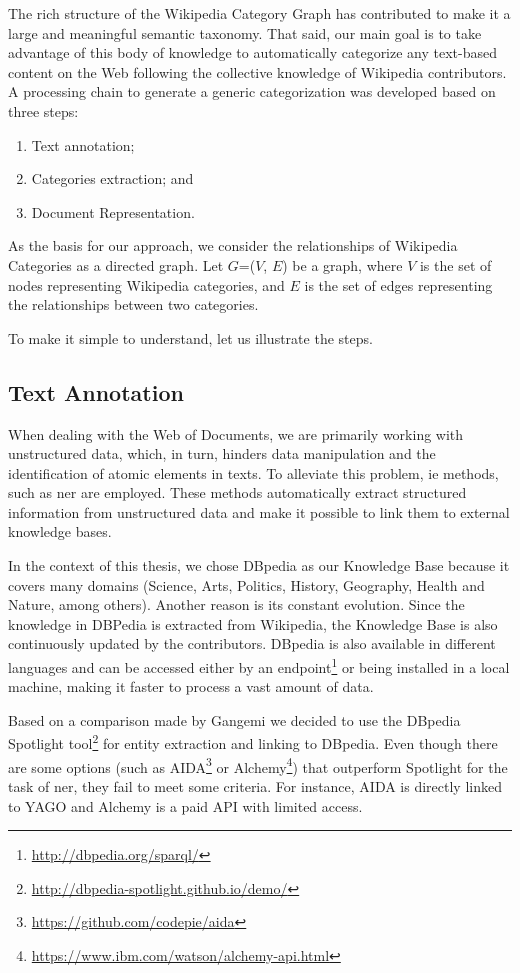 The rich structure of the Wikipedia Category Graph has contributed to make it a large and meaningful semantic taxonomy. That said, our main goal is to take advantage of this body of knowledge to automatically categorize any text-based content on the Web following the collective knowledge of Wikipedia contributors. A processing chain to generate a generic categorization was developed based on three steps: 

\begin{enumerate}
\item Text annotation;
\item Categories extraction; and
\item Document Representation.

\end{enumerate}
As the basis for our approach, we consider the relationships of Wikipedia Categories as a directed graph. Let $G$=($V$, $E$) be a graph, where $V$ is the set of nodes representing Wikipedia categories, and $E$ is the set of edges representing the relationships between two categories.

To make it simple to understand, let us illustrate the steps.

\subsection{\hspace*{3pt} Text Annotation} 
\label{sec:text-annotation}
When dealing with the Web of Documents, we are primarily working with unstructured data, which, in turn, hinders data manipulation and the identification of atomic elements in texts. To alleviate this problem, \gls{ie} methods, such as \gls{ner} are employed. These methods automatically extract structured information from unstructured data and make it possible to link them to external knowledge bases. 

In the context of this thesis, we chose DBpedia as our Knowledge Base because it covers many domains (Science, Arts, Politics, History, Geography, Health and Nature, among others). Another reason is its constant evolution. Since the knowledge in DBPedia is extracted from Wikipedia,  the Knowledge Base is also continuously updated by the contributors. DBpedia is also available in different languages and can be accessed either by an endpoint\footnote{\url{http://dbpedia.org/sparql/}} or being installed in a local machine, making it faster to process a vast amount of data.

Based on a comparison made by Gangemi\cite{gangemi2013comparison} we decided to use the DBpedia Spotlight  tool\footnote{\url{http://dbpedia-spotlight.github.io/demo/}} for entity extraction and linking to DBpedia. Even though there are some options (such as AIDA\footnote{\url{https://github.com/codepie/aida}} or Alchemy\footnote{\url{https://www.ibm.com/watson/alchemy-api.html}}) that outperform Spotlight for the task of \gls{ner}, they fail to meet some criteria. For instance, AIDA is directly linked to YAGO and Alchemy is a paid API with limited access.  


